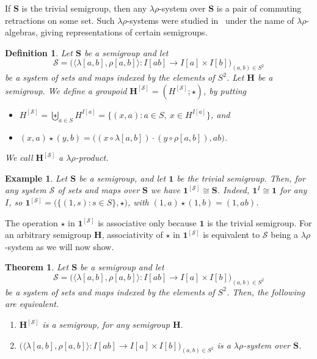 \documentclass{amsart}
\newtheorem{theorem}{Theorem}
\newtheorem{example}{Example}
\newtheorem{definition}{Definition}
\begin{document}
If $\mathbf{S}$ is the trivial semigroup, then 
any $\lambda\rho$-system over $\mathbf{S}$ is a 
pair of commuting retractions on some set. 
Such $\lambda\rho$-systems were studied in~\cite{Bot21}
under the name of $\lambda\rho$-algebras, giving representations of certain
semigroups. 



\begin{definition}\label{rl-prod}
Let $\mathbf{S}$ be a semigroup and let
$$
\mathcal{S} =   
\bigl(\langle\lambda[a,b],\rho[a,b]\rangle\colon 
I[ab]\to I[a]\times I[b]\bigr)_{(a,b)\in S^2}
$$
be a system of sets and maps indexed by the elements of $S^2$.
Let $\mathbf{H}$ be a semigroup. 
We define a groupoid  
$\mathbf{H}^{[\mathcal{S}]} = (H ^{[\mathcal{S}]};\star)$, by putting 
\begin{itemize}
\item $H^{[\mathcal{S}]} = \biguplus_{a\in S} H^{I[a]} = \{(x,a)\colon a\in S,\
  x\in H^{I[a]}\}$, and 
\item $(x,a)\star(y,b) = \bigl((x\circ\lambda[a,b])\cdot(y\circ\rho[a,b]),ab\bigr)$.
\end{itemize}
We call $\mathbf{H}^{[\mathcal{S}]}$ a \emph{$\lambda\rho$-product}.
\end{definition}


\begin{example}\label{skel}
Let $\mathbf{S}$ be a semigroup, and let $\mathbf{1}$ be the trivial semigroup.
Then, for any system $\mathcal{S}$ of sets and maps over $\mathbf{S}$ we have
$\mathbf{1}^{[\mathcal{S}]}\cong \mathbf{S}$. Indeed, $\mathbf{1}^I\cong
\mathbf{1}$ for any $I$, so
$\mathbf{1}^{[\mathcal{S}]} = \bigl(\{(1,s)\colon s\in S\},\star\bigr)$, with
$(1,a)\star(1,b) = (1,ab)$.  
\end{example}

The operation $\star$ in $\mathbf{1}^{[\mathcal{S}]}$ is associative only because  
$\mathbf{1}$ is the trivial semigroup. For an arbitrary semigroup 
$\mathbf{H}$, associativity of $\star$ in $\mathbf{1}^{[\mathcal{S}]}$
is equivalent to $\mathcal{S}$ being a $\lambda\rho$-system as we will now show.  

\begin{theorem}\label{main}
Let $\mathbf{S}$ be a semigroup and let
$$
\mathcal{S} = 
\bigl(\langle\lambda[a,b],\rho[a,b]\rangle\colon 
I[ab]\to I[a]\times I[b]\bigr)_{(a,b)\in S^2}
$$
be a system of sets and maps indexed by the elements of $S^2$. 
Then, the following are equivalent.
\begin{enumerate}
\item $\mathbf{H}^{[\mathcal{S}]}$ is a semigroup, for any semigroup $\mathbf{H}$.
\item $\bigl(\langle\lambda[a,b],\rho[a,b]\rangle\colon 
I[ab]\to I[a]\times I[b]\bigr)_{(a,b)\in S^2}$ is a $\lambda\rho$-system over $\mathbf{S}$.
\end{enumerate}
\end{theorem}
\end{document}

